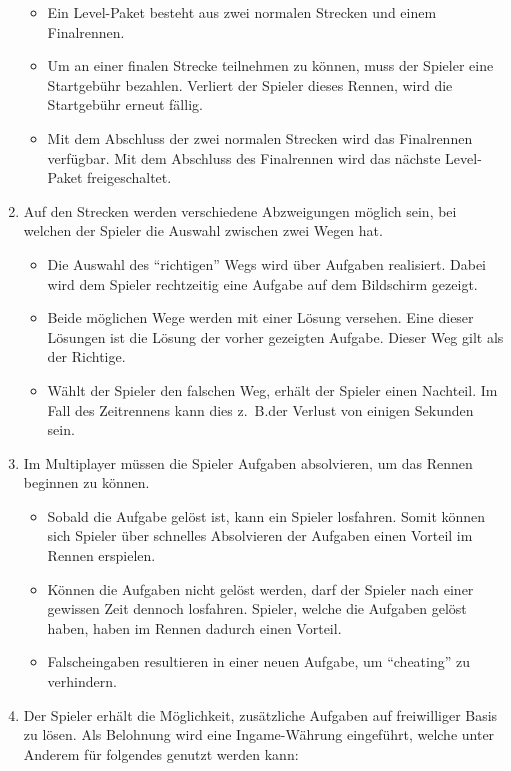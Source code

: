 \begin{enumerate}
		\begin{itemize}
			\item{Ein Level-Paket besteht aus zwei normalen Strecken und einem Finalrennen.}
			\item{Um an einer finalen Strecke teilnehmen zu können, muss der Spieler eine Startgebühr bezahlen. Verliert der Spieler dieses Rennen, wird die Startgebühr erneut fällig.}
			\item{Mit dem Abschluss der zwei normalen Strecken wird das Finalrennen verfügbar. Mit dem Abschluss des Finalrennen wird das nächste Level-Paket freigeschaltet.}
		\end{itemize}
		\item{Auf den Strecken werden verschiedene Abzweigungen möglich sein, bei welchen der Spieler die Auswahl zwischen zwei Wegen hat.}
		\begin{itemize}
			\item{Die Auswahl des \enquote{richtigen} Wegs wird über Aufgaben realisiert. Dabei wird dem Spieler rechtzeitig eine Aufgabe auf dem Bildschirm gezeigt.}
			\item{Beide möglichen Wege werden mit einer Lösung versehen. Eine dieser Lösungen ist die Lösung der vorher gezeigten Aufgabe. Dieser Weg gilt als der Richtige.}
			\item{Wählt der Spieler den falschen Weg, erhält der Spieler einen Nachteil. Im Fall des Zeitrennens kann dies z.~B.\@ der Verlust von einigen Sekunden sein.}
		\end{itemize}
		\item{Im Multiplayer müssen die Spieler Aufgaben absolvieren, um das Rennen beginnen zu können.}
			\begin{itemize}
				\item{Sobald die Aufgabe gelöst ist, kann ein Spieler losfahren. Somit können sich Spieler über schnelles Absolvieren der Aufgaben einen Vorteil im Rennen erspielen.}
				\item{Können die Aufgaben nicht gelöst werden, darf der Spieler nach einer gewissen Zeit dennoch losfahren. Spieler, welche die Aufgaben gelöst haben, haben im Rennen dadurch einen Vorteil.}
				\item{Falscheingaben resultieren in einer neuen Aufgabe, um \enquote{cheating} zu verhindern.}
			\end{itemize}
		\item{Der Spieler erhält die Möglichkeit, zusätzliche Aufgaben auf freiwilliger Basis zu lösen. Als Belohnung wird eine Ingame-Währung eingeführt, welche unter Anderem für folgendes genutzt werden kann:}

\end{enumerate}
